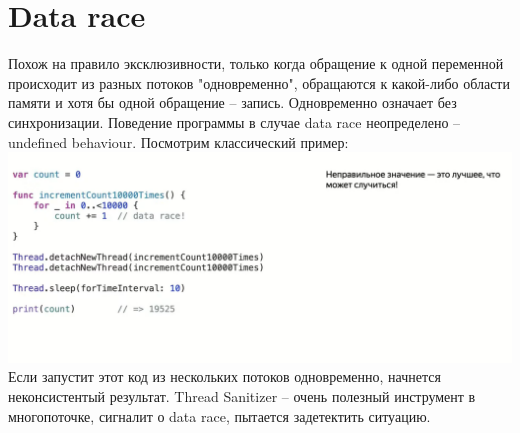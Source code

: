 \documentclass{article}
\begin{document}
    \section{Data race}
    Похож на правило эксклюзивности, только когда обращение к одной переменной происходит из разных потоков "одновременно", обращаются к какой-либо области памяти и хотя бы одной обращение -- запись. Одновременно означает без синхронизации. Поведение программы в случае data race неопределено -- undefined behaviour. 
    \newline
    Посмотрим классический пример: 
    \newline
    \includegraphics[scale = 0.2]{pic/Снимок экрана 2023-08-04 в 12.06.18.png}
    \newline
    Если запустит этот код из нескольких потоков одновременно, начнется неконсистентый результат. 
    \newline
    Thread Sanitizer -- очень полезный инструмент в многопоточке, сигналит о data race, пытается задетектить ситуацию. 
\end{document}

